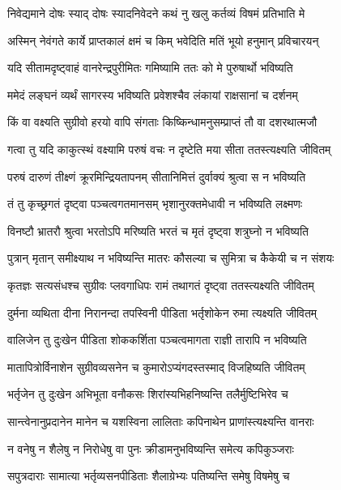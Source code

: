 \twolineshloka
{निवेद्यमाने दोषः स्याद् दोषः स्यादनिवेदने}
{कथं नु खलु कर्तव्यं विषमं प्रतिभाति मे} %

\twolineshloka
{अस्मिन् नेवंगते कार्ये प्राप्तकालं क्षमं च किम्}
{भवेदिति मतिं भूयो हनुमान् प्रविचारयन्} %

\twolineshloka
{यदि सीतामदृष्ट्वाहं वानरेन्द्रपुरीमितः}
{गमिष्यामि ततः को मे पुरुषार्थो भविष्यति} %

\twolineshloka
{ममेदं लङ्घनं व्यर्थं सागरस्य भविष्यति}
{प्रवेशश्चैव लंकायां राक्षसानां च दर्शनम्} %

\twolineshloka
{किं वा वक्ष्यति सुग्रीवो हरयो वापि संगताः}
{किष्किन्धामनुसम्प्राप्तं तौ वा दशरथात्मजौ} %

\twolineshloka
{गत्वा तु यदि काकुत्स्थं वक्ष्यामि परुषं वचः}
{न दृष्टेति मया सीता ततस्त्यक्ष्यति जीवितम्} %

\twolineshloka
{परुषं दारुणं तीक्ष्णं क्रूरमिन्द्रियतापनम्}
{सीतानिमित्तं दुर्वाक्यं श्रुत्वा स न भविष्यति} %

\twolineshloka
{तं तु कृच्छ्रगतं दृष्ट्वा पञ्चत्वगतमानसम्}
{भृशानुरक्तमेधावी न भविष्यति लक्ष्मणः} %

\twolineshloka
{विनष्टौ भ्रातरौ श्रुत्वा भरतोऽपि मरिष्यति}
{भरतं च मृतं दृष्ट्वा शत्रुघ्नो न भविष्यति} %

\twolineshloka
{पुत्रान् मृतान् समीक्ष्याथ न भविष्यन्ति मातरः}
{कौसल्या च सुमित्रा च कैकेयी च न संशयः} %

\twolineshloka
{कृतज्ञः सत्यसंधश्च सुग्रीवः प्लवगाधिपः}
{रामं तथागतं दृष्ट्वा ततस्त्यक्ष्यति जीवितम्} %

\twolineshloka
{दुर्मना व्यथिता दीना निरानन्दा तपस्विनी}
{पीडिता भर्तृशोकेन रुमा त्यक्ष्यति जीवितम्} %

\twolineshloka
{वालिजेन तु दुःखेन पीडिता शोककर्शिता}
{पञ्चत्वमागता राज्ञी तारापि न भविष्यति} %

\twolineshloka
{मातापित्रोर्विनाशेन सुग्रीवव्यसनेन च}
{कुमारोऽप्यंगदस्तस्माद् विजहिष्यति जीवितम्} %

\twolineshloka
{भर्तृजेन तु दुःखेन अभिभूता वनौकसः}
{शिरांस्यभिहनिष्यन्ति तलैर्मुष्टिभिरेव च} %

\twolineshloka
{सान्त्वेनानुप्रदानेन मानेन च यशस्विना}
{लालिताः कपिनाथेन प्राणांस्त्यक्ष्यन्ति वानराः} %

\twolineshloka
{न वनेषु न शैलेषु न निरोधेषु वा पुनः}
{क्रीडामनुभविष्यन्ति समेत्य कपिकुञ्जराः} %

\twolineshloka
{सपुत्रदाराः सामात्या भर्तृव्यसनपीडिताः}
{शैलाग्रेभ्यः पतिष्यन्ति समेषु विषमेषु च} %

